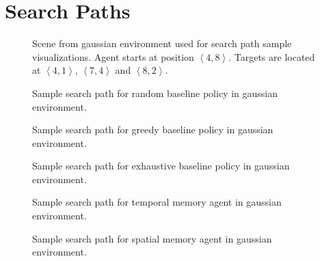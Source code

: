 \chapter{Search Paths}
\label{app:paths}

\begin{figure}
    \centering
    
    \caption[Scene for search paths]{Scene from gaussian environment used for search path sample visualizations. Agent starts at position \(\left\langle 4, 8 \right\rangle\). Targets are located at \(\left\langle 4, 1 \right\rangle\), \(\left\langle 7, 4 \right\rangle\) and \(\left\langle 8, 2 \right\rangle\).}
    \label{fig:path-scene}
\end{figure}    

\begin{figure}
    \centering
    
    \caption[Random baseline search path]{Sample search path for random baseline policy in gaussian environment.}
    \label{fig:path-random}
\end{figure}

\begin{figure}
    \centering
    
    \caption[Random baseline search path]{Sample search path for greedy baseline policy in gaussian environment.}
    \label{fig:path-greedy}
\end{figure}

\begin{figure}
    \centering
    
    \caption[Random baseline search path]{Sample search path for exhaustive baseline policy in gaussian environment.}
    \label{fig:path-exhaustive}
\end{figure}

\begin{figure}
    \centering
    
    \caption[Temporal memory agent search path]{Sample search path for temporal memory agent in gaussian environment.}
    \label{fig:path-lstm}
\end{figure}

\begin{figure}
    \centering
    
    \caption[Spatial memory agent search path]{Sample search path for spatial memory agent in gaussian environment.}
    \label{fig:path-map}
\end{figure}